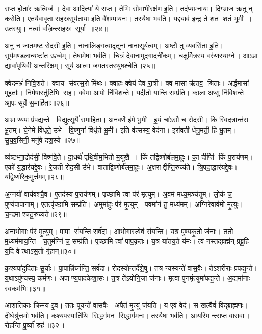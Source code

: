 स॒प्त होता॑र ऋ॒त्विज॑। देवा आदित्या॑ ये स॒प्त। 
तेभिः सोमाभीरक्ष॑ण इ॒ति। तद॑प्याम्ना॒यः। 
दिग्भ्राज ऋतून्‌ करो॒ति। एत॑यैवा॒वृता सहस्रसूर्यताया इति वै॑शम्पा॒यनः। 
तस्यै॒षा भव॑ति। यद्द्याव॑ इन्द्र ते श॒त श॒तं भूमी। 
उ॒तस्युः। नत्वा॑ वज्रिन्त्स॒हस्र॒ सूर्या॥२४॥

अनु न जातमष्ट रोद॑सी इ॒ति। नानालिङ्गत्वादृतूनां नाना॑सूर्य॒त्वम्। 
अष्टौ तु व्यवसि॑ता इ॒ति। सूर्यमण्डलान्यष्टा॑त ऊ॒र्ध्वम्‌। 
तेषा॑मेषा॒ भव॑ति। चि॒त्रं दे॒वाना॒मुद॑गा॒दनी॑कम्। 
चक्षु॑र्मि॒त्रस्य॒ वरु॑णस्या॒ग्नेः। आऽप्रा॒ द्यावा॑पृथि॒वी अ॒न्तरि॑क्षम्। 
सूर्य आत्मा जगतस्तस्थु॑षश्चे॒ति॥२५॥\anuvakamend


क्वेदमभ्रं॑ निवि॒शते। क्वाय संवत्स॒रो मि॑थः। 
क्वाहः क्वेयं दे॑व रा॒त्री। क्व मासा ऋ॑तव॒ श्रिताः। 
अर्द्धमासा॑ मुहू॒र्ताः। निमेषास्तु॑टिभि॒ सह। 
क्वेमा आपो नि॑विश॒न्ते। य॒दीतो॑ यान्ति॒ सम्प्र॑ति। 
काला अप्सु नि॑विश॒न्ते। आ॒पः सूर्ये॑ स॒माहि॑ताः॥२६॥

अभ्राण्य॒पः प्र॑पद्य॒न्ते। वि॒द्युत्सूर्ये॑ स॒माहि॑ता। 
अनवर्णे इ॑मे भू॒मी। इ॒यं चा॑ऽसौ च॒ रोद॑सी। 
किस्विदत्रान्त॑रा भू॒तम्। ये॒नेमे वि॑धृते॒ उभे। 
वि॒ष्णुना॑ विधृ॑ते भू॒मी। इ॒ति व॑त्सस्य॒ वेद॑ना। 
इरा॑वती धेनु॒मती॒ हि भू॒तम्‌। सू॒य॒व॒सिनी॒ मनु॑षे दश॒स्ये॥२७॥

व्य॑ष्टभ्ना॒द्रोद॑सी॒ विष्ण॑वे॒ते। दा॒धर्थ॑ पृथि॒वीम॒भितो॑ म॒यूखै। 
किं तद्विष्णोर्ब॑ल\-मा॒हुः। का॒ दीप्ति॑ किं प॒राय॑णम्‌। 
एको॑ य॒द्धार॑यद्दे॒वः। रे॒जती॑ रोद॒सी उ॑भे। 
वाताद्विष्णोर्ब॑लमा॒हुः। अ॒क्षराद्दीप्ति॒रुच्य॑ते। 
त्रि॒पदा॒द्धार॑यद्दे॒वः। यद्विष्णो॑रेक॒मुत्त॑मम्‌॥२८॥

अ॒ग्नयो॑ वाय॑वश्चै॒व। ए॒तद॑स्य प॒राय॑णम्‌। 
पृच्छामि त्वा प॑रं मृ॒त्युम्‌। अ॒वमं॑ मध्य॒मञ्च॑तुम्‌। 
लो॒कं च॒ पुण्य॑पापा॒नाम्‌। ए॒तत्पृ॑च्छामि॒ सम्प्र॑ति। 
अ॒मुमा॑हुः प॑रं मृ॒त्युम्‌। प॒वमा॑नं तु॒ मध्य॑मम्‌। 
अ॒ग्निरे॒वाव॑मो मृ॒त्युः। च॒न्द्रमाश्चतु॒रुच्य॑ते॥२९॥

अ॒ना॒भो॒गाः प॑रं मृ॒त्युम्‌। पा॒पा सं॑यन्ति॒ सर्व॑दा। 
आभोगास्त्वेव॑ संय॒न्ति। य॒त्र पु॑ण्यकृ॒तो ज॑नाः। 
ततो॑ म॒ध्यम॑माय॒न्ति। च॒तुम॑ग्निं च॒ सम्प्र॑ति। 
पृच्छामि त्वा॑ पाप॒कृतः। य॒त्र या॑तय॒ते य॑मः। 
त्वं नस्तद्ब्रह्म॑न्‌ प्रब्रू॒हि। य॒दि वेत्थाऽस॒तो गृ॑हान्‌॥३०॥

क॒श्यपा॑दुदि॑ताः सू॒र्याः। पा॒पान्नि॑र्घ्नन्ति॒ सर्व॑दा। 
रोदस्योन्त॑र्देशे॒षु। तत्र न्यस्यन्ते॑ वास॒वैः। 
तेऽशरीराः प्र॑पद्य॒न्ते। य॒थाऽपु॑ण्यस्य॒ कर्म॑णः। 
अपाण्य॒पाद॑केशा॒सः। त॒त्र ते॑ऽयोनि॒जा ज॑नाः। 
मृत्वा पुनर्मृत्युमा॑पद्य॒न्ते। अ॒द्यमा॑नाः स्व॒कर्म॑भिः॥३१॥

आशातिकाः क्रिम॑य इ॒व। ततः पूयन्ते॑ वास॒वैः। अपै॑तं मृ॒त्युं ज॑यति। 
य ए॒वं वेद॑। स खल्वैवं॑ विद्ब्रा॒ह्मणः। दी॒र्घश्रु॑त्तमो॒ भव॑ति। 
कश्य॑प॒स्याति॑थि॒ सिद्धग॑मन॒ सिद्धाग॑मनः। तस्यै॒षा भव॑ति। 
आयस्मिन्त्स॒प्त वा॑स॒वाः। रोह॑न्ति पू॒र्व्या॑ रुह॑॥३२॥

